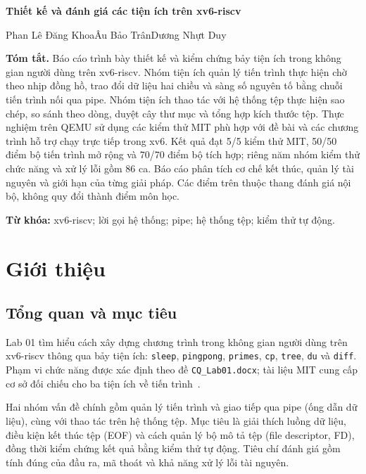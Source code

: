 \documentclass[12pt,a4paper]{article}
\newcommand{\code}[1]{\texttt{#1}}
\begin{document}
\begin{center}
{\large\bfseries Thiết kế và đánh giá các tiện ích trên xv6-riscv}\par
\vspace{4pt}
{\small Phan Lê Đăng Khoa\quad Âu Bảo Trân\quad Dương Nhựt Duy}
\end{center}
\vspace{3pt}
\begingroup\small
\noindent\textbf{Tóm tắt.} Báo cáo trình bày thiết kế và kiểm chứng bảy tiện ích trong không gian người dùng trên xv6-riscv. Nhóm tiện ích quản lý tiến trình thực hiện chờ theo nhịp đồng hồ, trao đổi dữ liệu hai chiều và sàng số nguyên tố bằng chuỗi tiến trình nối qua pipe. Nhóm tiện ích thao tác với hệ thống tệp thực hiện sao chép, so sánh theo dòng, duyệt cây thư mục và tổng hợp kích thước tệp. Thực nghiệm trên QEMU sử dụng các kiểm thử MIT phù hợp với đề bài và các chương trình hỗ trợ chạy trực tiếp trong xv6. Kết quả đạt 5/5 kiểm thử MIT, 50/50 điểm bộ tiến trình mở rộng và 70/70 điểm bộ tích hợp; riêng năm nhóm kiểm thử chức năng và xử lý lỗi gồm 86 ca. Báo cáo phân tích cơ chế kết thúc, quản lý tài nguyên và giới hạn của từng giải pháp. Các điểm trên thuộc thang đánh giá nội bộ, không quy đổi thành điểm môn học.
\par\smallskip
\noindent\textbf{Từ khóa:} xv6-riscv; lời gọi hệ thống; pipe; hệ thống tệp; kiểm thử tự động.
\endgroup
\vspace{5pt}
\section{Giới thiệu}\label{sec:intro}
\subsection{Tổng quan và mục tiêu}
Lab 01 tìm hiểu cách xây dựng chương trình trong không gian người dùng trên xv6-riscv thông qua bảy tiện ích: \code{sleep}, \code{pingpong}, \code{primes}, \code{cp}, \code{tree}, \code{du} và \code{diff}. Phạm vi chức năng được xác định theo đề \code{CQ\_Lab01.docx}; tài liệu MIT cung cấp cơ sở đối chiếu cho ba tiện ích về tiến trình~\cite{assignment,mit-util}.

Hai nhóm vấn đề chính gồm quản lý tiến trình và giao tiếp qua pipe (ống dẫn dữ liệu), cùng với thao tác trên hệ thống tệp. Mục tiêu là giải thích luồng dữ liệu, điều kiện kết thúc tệp (EOF) và cách quản lý bộ mô tả tệp (file descriptor, FD), đồng thời kiểm chứng kết quả bằng kiểm thử tự động. Tiêu chí đánh giá gồm tính đúng của đầu ra, mã thoát và khả năng xử lý lỗi tài nguyên.
\end{document}
